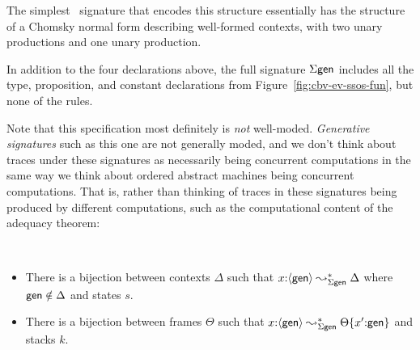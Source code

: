The simplest \sls~signature that encodes this structure essentially
has the structure of a Chomsky normal form describing well-formed
contexts, with two unary productions and one unary production.

\smallskip
{}
\smallskip

\noindent In addition to the four declarations above, the full
signature $\Sigma\sf gen$ includes all the type, proposition, and
constant declarations from Figure~\ref{fig:cbv-ev-ssos-fun}, but none
of the rules.

Note that this specification most definitely is {\it not} well-moded.
{\it Generative signatures} such as this one are not generally moded,
and we don't think about traces under these signatures as 
necessarily being concurrent computations in the same way we think
about ordered abstract machines being concurrent computations. That is,
rather than thinking of traces in these signatures being produced by
different computations, such as the computational content of the adequacy
theorem:

\bigskip
\begin{theorem}~
\begin{itemize}
\item There is a bijection between contexts $\Delta$ such that
  $x{:}\langle {\sf gen} \rangle \leadsto^*_{\Sigma\sf gen} \Delta$ where ${\sf gen} \notin \Delta$
  and states $s$.
\item There is a bijection between frames $\Theta$ such that $x{:}\langle {\sf
    gen} \rangle \leadsto^*_{\Sigma\sf gen} {\Theta}\{{x'{:}{\sf gen}}\}$ and
  stacks $k$.
\end{itemize}
\end{theorem}

